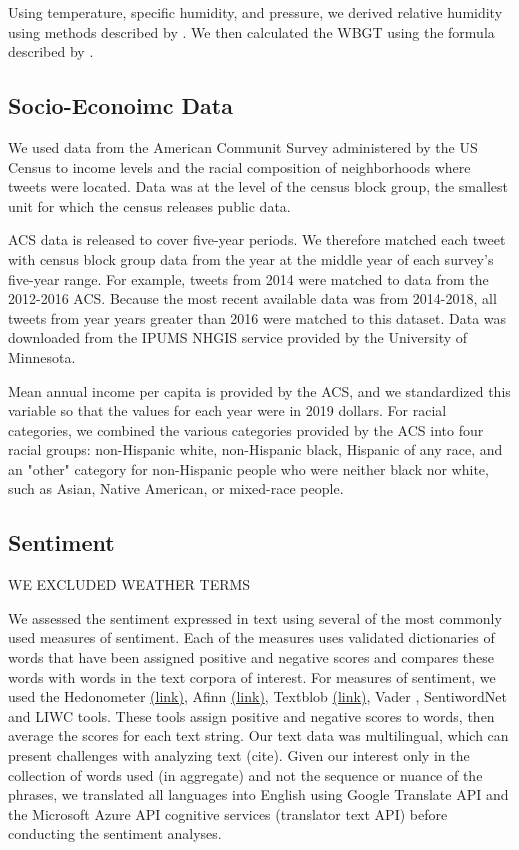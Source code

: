 \documentclass{article}
\begin{document}
Using temperature, specific humidity, and pressure, we derived relative humidity using methods described by  \cite{bolton_computation_1980}.  We then calculated the WBGT using the formula described by \cite{heo2019comparison}.

\subsection{Socio-Econoimc Data}
We used data from the American Communit   Survey administered by the US Census to income levels and the racial composition of neighborhoods where tweets were located.  Data was at the level of the census block group, the smallest unit for which the census releases public data.

ACS data is released to cover five-year periods.  We therefore matched each tweet with census block group data from the year at the middle year of each survey's five-year range.  For example, tweets from 2014 were matched to data from the 2012-2016 ACS.  Because the most recent available data was from 2014-2018, all tweets from year years greater than 2016 were matched to this dataset.  Data was downloaded from the IPUMS NHGIS service provided by the University of Minnesota.

Mean annual income per capita is provided by the ACS, and we standardized this variable so that the values for each year were in 2019 dollars.  For racial categories, we combined the various categories provided by the ACS into four racial groups: non-Hispanic white, non-Hispanic black, Hispanic of any race, and an "other" category for non-Hispanic people who were neither black nor white, such as Asian, Native American, or mixed-race people.


\subsection{Sentiment}

WE EXCLUDED WEATHER TERMS

We assessed the sentiment expressed in text using several of the most commonly used measures of sentiment. Each of the measures uses validated dictionaries of words that have been assigned positive and negative scores and compares these words with words in the text corpora of interest. For measures of sentiment, we used the Hedonometer \href{https://hedonometer.org/timeseries/en_all/}{(link)}, Afinn \href{http://corpustext.com/reference/sentiment_afinn.html}{(link)}, Textblob \href{https://textblob.readthedocs.io/en/dev/}{(link)}, Vader , SentiwordNet and LIWC tools. These tools assign positive and negative scores to words, then average the scores for each text string. Our text data was multilingual, which can present challenges with analyzing text (cite). Given our interest only in the collection of words used (in aggregate) and not the sequence or nuance of the phrases, we translated all languages into English using Google Translate API and the Microsoft Azure API cognitive services (translator text API) before conducting the sentiment analyses.
\end{document}
